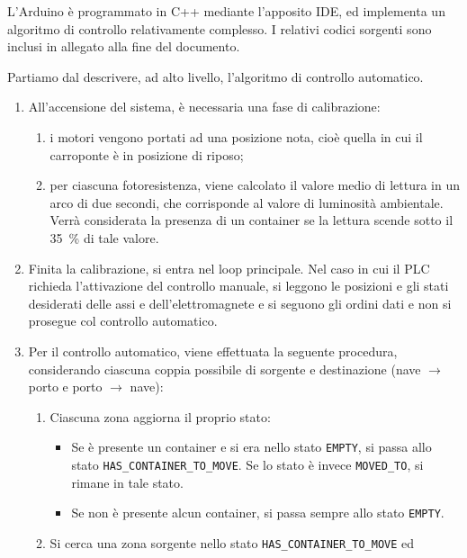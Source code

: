 L'Arduino è programmato in C++ mediante l'apposito IDE, ed implementa un algoritmo di controllo
relativamente complesso. I relativi codici sorgenti sono inclusi in allegato alla fine del
documento.

Partiamo dal descrivere, ad alto livello, l'algoritmo di controllo automatico.
\begin{enumerate}
    \item All'accensione del sistema, è necessaria una fase di calibrazione:
        \begin{enumerate}
            \item i motori vengono portati ad una posizione nota, cioè quella in cui il carroponte è
                in posizione di riposo;
            \item per ciascuna fotoresistenza, viene calcolato il valore medio di lettura in un arco
                di due secondi, che corrisponde al valore di luminosità ambientale. Verrà
                considerata la presenza di un container se la lettura scende sotto il
                \qty{35}{\percent} di tale valore.
        \end{enumerate}
    \item Finita la calibrazione, si entra nel loop principale. Nel caso in cui il PLC richieda
        l'attivazione del controllo manuale, si leggono le posizioni e gli stati desiderati delle
        assi e dell'elettromagnete e si seguono gli ordini dati e non si prosegue col controllo automatico.
    \item Per il controllo automatico, viene effettuata la seguente procedura, considerando ciascuna
        coppia possibile di sorgente e destinazione (nave $\to$ porto e porto $\to$ nave):
        \begin{enumerate}
            \item Ciascuna zona aggiorna il proprio stato:
                \begin{itemize}
                    \item Se è presente un container e si era nello stato \texttt{EMPTY}, si passa
                        allo stato \texttt{HAS\_\-CONTAINER\_\-TO\_\-MOVE}. Se lo stato è invece
                        \texttt{MOVED\_TO}, si rimane in tale stato.
                    \item Se non è presente alcun container, si passa sempre allo stato
                        \texttt{EMPTY}.
                \end{itemize}
            \item Si cerca una zona sorgente nello stato \texttt{HAS\_\-CONTAINER\_\-TO\_\-MOVE} ed

\end{enumerate}
\end{enumerate}
